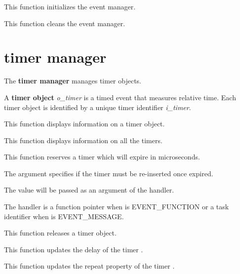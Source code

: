 	 {
	   This function initializes the event manager.
	 }

	 {
	   This function cleans the event manager.
	 }

%
%

\section{timer manager}

The \textbf{timer manager} manages timer objects.

A \textbf{timer object} \textit{o\_timer} is a timed event that measures
relative time. Each timer object is identified by a unique timer identifier
\textit{i\_timer}.

%
%

	 {
	   This function displays information on a timer object.
	 }

	 {
	   This function displays information on all the timers.
	 }

	 {
	   This function reserves a timer which will expire in
	    microseconds.

	   The  argument specifies if the timer
	   must be re-inserted once expired.

	   The  value will be passed as an argument
	   of the handler.

	   The handler  is a function pointer when
	    is EVENT\_FUNCTION or a task identifier when
	    is EVENT\_MESSAGE.
	 }

	 {
	   This function releases a timer object.
	 }

	 {
	   This function updates the delay of the timer .
	 }

	 {
	   This function updates the repeat property of the timer
	   .
	 }

